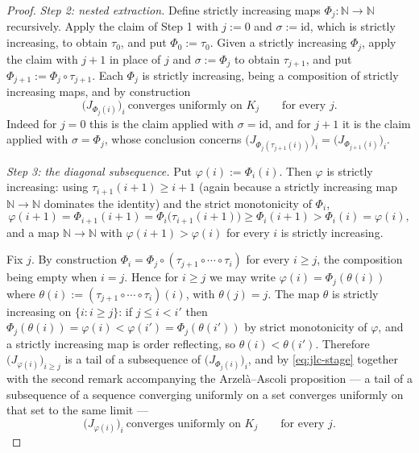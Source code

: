 \begin{proof}
\medskip\noindent\emph{Step 2: nested extraction.}
Define strictly increasing maps $\Phi_j\colon\mathbb{N}\to\mathbb{N}$ recursively.  Apply the
claim of Step 1 with $j:=0$ and $\sigma:=\mathrm{id}$, which is strictly increasing, to obtain
$\tau_0$, and put $\Phi_0:=\tau_0$.  Given a strictly increasing $\Phi_j$, apply the claim with
$j+1$ in place of $j$ and $\sigma:=\Phi_j$ to obtain $\tau_{j+1}$, and put
$\Phi_{j+1}:=\Phi_j\circ\tau_{j+1}$.  Each $\Phi_j$ is strictly increasing, being a composition
of strictly increasing maps, and by construction
\begin{equation}\label{eq:jlc-stage}
  \bigl(J_{\Phi_j(i)}\bigr)_i\ \text{converges uniformly on }K_j\qquad\text{for every }j .
\end{equation}
Indeed for $j=0$ this is the claim applied with $\sigma=\mathrm{id}$, and for $j+1$ it is the
claim applied with $\sigma=\Phi_j$, whose conclusion concerns
$\bigl(J_{\Phi_j(\tau_{j+1}(i))}\bigr)_i=\bigl(J_{\Phi_{j+1}(i)}\bigr)_i$.

\medskip\noindent\emph{Step 3: the diagonal subsequence.}
Put $\varphi(i):=\Phi_i(i)$.  Then $\varphi$ is strictly increasing: using
$\tau_{i+1}(i+1)\ge i+1$ (again because a strictly increasing map $\mathbb{N}\to\mathbb{N}$
dominates the identity) and the strict monotonicity of $\Phi_i$,
\[
  \varphi(i+1)=\Phi_{i+1}(i+1)=\Phi_i\bigl(\tau_{i+1}(i+1)\bigr)\ge\Phi_i(i+1)>\Phi_i(i)=\varphi(i),
\]
and a map $\mathbb{N}\to\mathbb{N}$ with $\varphi(i+1)>\varphi(i)$ for every $i$ is strictly
increasing.

Fix $j$.  By construction $\Phi_i=\Phi_j\circ(\tau_{j+1}\circ\cdots\circ\tau_i)$ for every
$i\ge j$, the composition being empty when $i=j$.  Hence for $i\ge j$ we may write
$\varphi(i)=\Phi_j(\theta(i))$ where $\theta(i):=(\tau_{j+1}\circ\cdots\circ\tau_i)(i)$, with
$\theta(j)=j$.  The map $\theta$ is strictly increasing on $\{i:i\ge j\}$: if $j\le i<i'$ then
$\Phi_j(\theta(i))=\varphi(i)<\varphi(i')=\Phi_j(\theta(i'))$ by strict monotonicity of
$\varphi$, and a strictly increasing map is order reflecting, so $\theta(i)<\theta(i')$.
Therefore $\bigl(J_{\varphi(i)}\bigr)_{i\ge j}$ is a tail of a subsequence of
$\bigl(J_{\Phi_j(i)}\bigr)_i$, and by \eqref{eq:jlc-stage} together with the second remark
accompanying the Arzel\`a--Ascoli proposition --- a tail of a subsequence of a sequence
converging uniformly on a set converges uniformly on that set to the same limit ---
\begin{equation}\label{eq:jlc-unif}
  \bigl(J_{\varphi(i)}\bigr)_i\ \text{converges uniformly on }K_j\qquad\text{for every }j .
\end{equation}


\end{proof}
